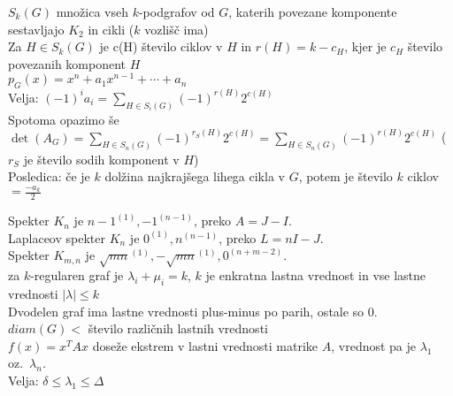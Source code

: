 \documentclass{article}
\theoremstyle{definition}
\begin{document}
$S_k(G)$ množica vseh $k$-podgrafov od $G$, katerih povezane komponente sestavljajo $K_2$ in cikli ($k$ vozlišč ima)\\
Za $H \in S_k(G)$ je c(H) število ciklov v $H$ in $r(H) = k - c_H$, kjer je $c_H$ število povezanih komponent $H$\\
$p_G(x) = x^n + a_1 x^{n-1} + \cdots + a_n$\\
Velja: $(-1)^i a_i = \sum_{H \in S_i(G)} (-1)^{r(H)} 2^{c(H)}$\\
Spotoma opazimo še $\det(A_G) = \sum_{H \in S_n(G)} (-1)^{r_S(H)} 2^{c(H)} = \sum_{H \in S_n(G)} (-1)^{r(H)} 2^{c(H)}$ ($r_S$ je število sodih komponent v $H$)\\
Posledica: če je $k$ dolžina najkrajšega lihega cikla v $G$, potem je število $k$ ciklov $= \frac{- a_k}{2}$

Spekter $K_n$ je $n-1^{(1)}, -1^{(n-1)}$, preko $A = J - I$.\\
Laplaceov spekter $K_n$ je $0^{(1)}, n^{(n-1)}$, preko $L = n I - J$.\\
Spekter $K_{m,n}$ je $\sqrt{mn}^{(1)}, - \sqrt{mn}^{(1)}, 0^{(n+m-2)}$.\\
za $k$-regularen graf je $\lambda_i + \mu_i = k$, $k$ je enkratna lastna vrednost in vse lastne vrednosti $|\lambda| \leq k$\\
Dvodelen graf ima lastne vrednosti plus-minus po parih, ostale so 0.\\
$diam(G) < $ število različnih lastnih vrednosti\\
$f(x) = x^T A x$ doseže ekstrem v lastni vrednosti matrike $A$, vrednost pa je $\lambda_1$ oz.\ $\lambda_n$.\\
Velja: $\delta \leq \lambda_1 \leq \Delta$
\end{document}
